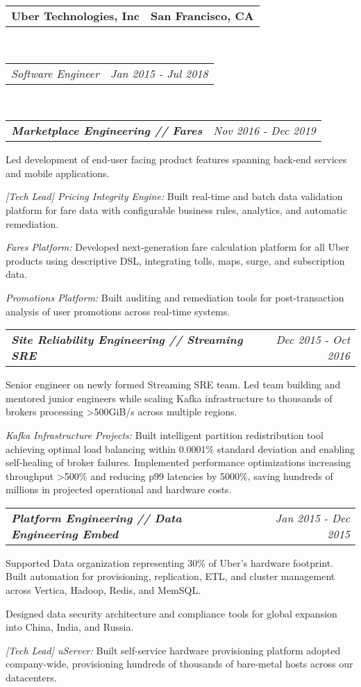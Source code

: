 \documentclass[12pt,letterpaper]{article}
\makeatletter
\newcommand{\area}[2]{\emph{#1:}   #2}
\newcommand{\subemployment}[3]{
	\headerrow
		{\hspace{8pt}\textbf{\emph{#1}}}
		{\emph{#2}}
	\vspace*{-15pt}
	\begin{itemize*}
		\item #3
	\end{itemize*}
}
\newcommand{\headerrow}[2]
{\begin{tabular*}{\linewidth}{l@{\extracolsep{\fill}}r}
	#1 &
	#2 \\
\end{tabular*}}
\newcommand{\employmentNoList}[5]{
	\headerrow
		{\textbf{#1}}
		{\textbf{#2}}
	\\
	\headerrow
		{\emph{#3}}
		{\emph{#4}}
	#5
}
\makeatother
\begin{document}
\employmentNoList{Uber Technologies, Inc}{San Francisco, CA}{Software Engineer}{Jan 2015 - Jul 2018}{
  \\
 \subemployment{Marketplace Engineering // Fares}{Nov 2016 - Dec 2019}{
 Led development of end-user facing product features spanning back-end services and mobile applications.
\item \area{[Tech Lead] Pricing Integrity Engine}{Built real-time and batch data validation platform for fare data with configurable business rules, analytics, and automatic remediation.}
\item \area{Fares Platform}{Developed next-generation fare calculation platform for all Uber products using descriptive DSL, integrating tolls, maps, surge, and subscription data.}
\item \area{Promotions Platform}{Built auditing and remediation tools for post-transaction analysis of user promotions across real-time systems.}
}

\subemployment
{Site Reliability Engineering // Streaming SRE}{Dec 2015 - Oct 2016}{
Senior engineer on newly formed Streaming SRE team. Led team building and mentored junior engineers while scaling Kafka infrastructure to thousands of brokers processing >500GiB/s across multiple regions.
\item \area{Kafka Infrastructure Projects}{Built intelligent partition redistribution tool achieving optimal load balancing within 0.0001\% standard deviation and enabling self-healing of broker failures. Implemented performance optimizations increasing throughput >500\% and reducing p99 latencies by 5000\%, saving hundreds of millions in projected operational and hardware costs.}
}

\subemployment
  {Platform Engineering // Data Engineering Embed}
  {Jan 2015 - Dec 2015}{
Supported Data organization representing 30\% of Uber's hardware footprint. Built automation for provisioning, replication, ETL, and cluster management across Vertica, Hadoop, Redis, and MemSQL.
\item Designed data security architecture and compliance tools for global expansion into China, India, and Russia.
\item \area{[Tech Lead] uServer}{Built self-service hardware provisioning platform adopted company-wide, provisioning hundreds of thousands of bare-metal hosts across our datacenters.}
}
}
\end{document}

